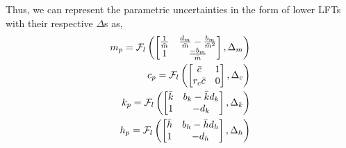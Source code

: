 Thus, we can represent the parametric uncertainties in the form of lower LFTs with their respective $\Delta$s as,
\begin{align*}
    m_p = \mathcal{F}_l\left(\begin{bmatrix}
        \frac{1}{\Bar{m}}&\frac{d_m}{\Bar{m}} - \frac{b_m}{\Bar{m}^2}\\
        1&\frac{-b_m}{\Bar{m}}
    \end{bmatrix},\Delta_m\right)\\
    c_p = \mathcal{F}_l\left(\begin{bmatrix}
        \Bar{c}&1\\
        r_c\Bar{c}&0
    \end{bmatrix},\Delta_c\right)\\
    k_p = \mathcal{F}_l\left(\begin{bmatrix}
        \Bar{k}&b_k-\Bar{k}d_k\\
        1&-d_k
    \end{bmatrix},\Delta_k\right)\\
    h_p = \mathcal{F}_l\left(\begin{bmatrix}
        \Bar{h}&b_h-\Bar{h}d_h\\
        1&-d_h
    \end{bmatrix},\Delta_h\right)\\
\end{align*}

